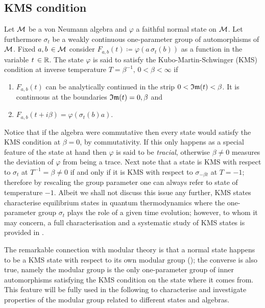  
 \subsection{\acf{KMS} condition}
 \label{KMS}
 Let $\mathcal{M}$ be a von Neumann algebra and $\varphi$ a faithful normal
 state on $\mathcal{M}$. Let furthermore $\sigma_t$ be a weakly
 continuous one-parameter group of automorphisms of $\mathcal{M}$. 
 Fixed $a,b\,\in\mathcal{M}$ consider $F_{a,b}(t)\coloneqq
 \varphi(a\,\sigma_t(b))$ as a function in the variable $t\,\in\mathbb{R}$.
 The state $\varphi$ is said to satisfy the Kubo-Martin-Schwinger
 (\ac{KMS}) condition at inverse temperature $T=\beta^{-1},\,0<\beta
 <\infty$ if 
 \begin{enumerate}
  \item $F_{a,b}(t)$ can be analytically continued in 
        the strip $0< \mathfrak{Im}(t)<\beta$. It is continuous at 
        the boundaries $\mathfrak{Im}(t)=0,\beta$ and
  \item $F_{a,b}(t+i\beta)=\varphi(\sigma_t(b)a)$.
 \end{enumerate}
 Notice that if the algebra were commutative then every state would
 satisfy the \ac{KMS} condition at $\beta=0$, by commutativity. 
 If this only happens as a special feature of the state at hand then
 $\varphi$ is said to be \emph{tracial}, otherwise $\beta\neq 0$ 
 measures the deviation of $\varphi$ from being a trace. Next note
 that a state is \ac{KMS} with respect to $\sigma_t$ at 
 $T^{-1}=\beta\neq 0$  if and only if it is \ac{KMS} with respect 
 to $\sigma_{-\beta t}$ at $T=-1$; therefore
 by rescaling the group parameter one can always refer to state
 of temperature $-1$. Albeit we shall not discuss this issue
 any further, \ac{KMS} states characterise equilibrium states in
 quantum thermodynamics where the one-parameter group $\sigma_t$
 plays the role of a given time evolution; however, to whom it may
 concern, a full characterisation and a systematic study of
 \ac{KMS} states is provided in \cite*{BRII:19781}.

 \medskip
 The remarkable connection with modular theory is that a normal
 state happens to be a \ac{KMS} state with respect to its own modular 
 group (\cite*{Haag}); the converse is also true, namely the modular 
 group is the only one-parameter group of inner
 automorphisms satisfying the \ac{KMS} condition on the state where it
 comes from. This feature will be fully used in the following to
 characterise and investigate properties of the modular group
 related to different states and algebras.
 
 
 
